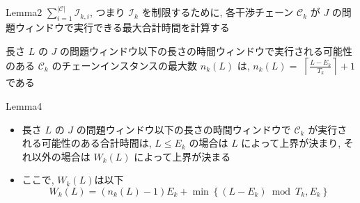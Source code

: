 \begin{frame}{Lemma2}
    $\sum_{i=1}^{|\mathcal{C}|} \mathcal{I}_{k, i}$, つまり $\mathcal{I}_{k}$ を制限するために, 各干渉チェーン $\mathcal{C}_{k}$ が $J$ の問題ウィンドウで実行できる最大合計時間を計算する

    \begin{lemma}[]
        長さ $L$ の $J$ の問題ウィンドウ以下の長さの時間ウィンドウで実行される可能性のある $\mathcal{C}_{k}$ のチェーンインスタンスの最大数 $n_{k}(L)$ は, $n_{k}(L)=$  $\left\lceil\frac{L-E_{k}}{T_{k}}\right\rceil+1$ である
    \end{lemma}
\end{frame}


\begin{frame}{Lemma4}
    \begin{lemma}[]
        \setlength{\linewidth}{0.98\columnwidth}
        \begin{itemize}
            \item 長さ $L$ の $J$ の問題ウィンドウ以下の長さの時間ウィンドウで $\mathcal{C}_{k}$ が実行される可能性のある合計時間は, $L \leq E_{k}$ の場合は $L$ によって上界が決まり, それ以外の場合は $W_{k}(L)$ によって上界が決まる
            \item ここで, $W_{k}(L)$は以下
                  \begin{equation*}
                      W_{k}(L)=\left(n_{k}(L)-1\right) E_{k}+\min \left\{\left(L-E_{k}\right) \bmod T_{k}, E_{k}\right\}
                  \end{equation*}
        \end{itemize}
    \end{lemma}
\end{frame}


